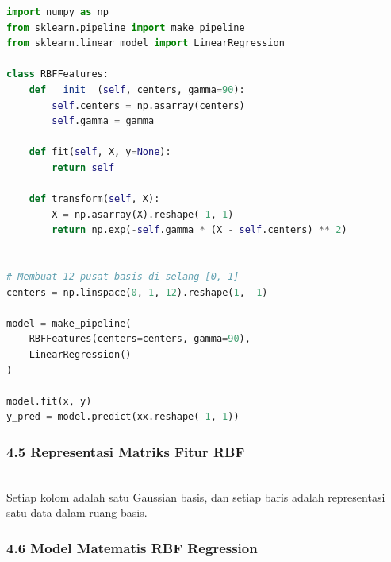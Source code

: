 \documentclass[12pt,a4paper]{article}
\begin{document}
\begin{lstlisting}[language=Python]
import numpy as np
from sklearn.pipeline import make_pipeline
from sklearn.linear_model import LinearRegression

class RBFFeatures:
    def __init__(self, centers, gamma=90):
        self.centers = np.asarray(centers)
        self.gamma = gamma

    def fit(self, X, y=None):
        return self

    def transform(self, X):
        X = np.asarray(X).reshape(-1, 1)
        return np.exp(-self.gamma * (X - self.centers) ** 2)


# Membuat 12 pusat basis di selang [0, 1]
centers = np.linspace(0, 1, 12).reshape(1, -1)

model = make_pipeline(
    RBFFeatures(centers=centers, gamma=90),
    LinearRegression()
)

model.fit(x, y)
y_pred = model.predict(xx.reshape(-1, 1))
\end{lstlisting}

\subsubsection{4.5 Representasi Matriks Fitur RBF}

\\[
\Phi =

\begin{bmatrix}

h_1(x_1) & h_2(x_1) & \dots & h_M(x_1) \\

h_1(x_2) & h_2(x_2) & \dots & h_M(x_2) \\

\vdots & \vdots & \ddots & \vdots \\

h_1(x_n) & h_2(x_n) & \dots & h_M(x_n)

\end{bmatrix}
\\]


Setiap kolom adalah satu Gaussian basis, dan setiap baris adalah representasi satu data dalam ruang basis.


\subsubsection{4.6 Model Matematis RBF Regression}

\\[
\hat{y}(x) = \beta_0 + \sum_{j=1}^{M} \beta_j \exp\left(-\gamma (x - c_j)^2\right)
\\]
\end{document}
